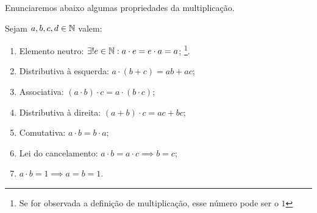 \documentclass[../main.tex]{subfiles}
\begin{document}
Enunciaremos abaixo algumas propriedades da multiplicação.
\begin{prop}{Sejam $a, b, c, d \in \mathbb{N}$ valem:}
    \begin{enumerate}[label=(\roman*)]
        \item Elemento neutro: $\exists! e \in \mathbb{N} : a \cdot e = e \cdot a = a$; \footnote{Se for observada a definição de multiplicação, esse número pode ser o $1$}.
        \item Distributiva à esquerda: $a \cdot (b + c) = ab + ac$;
        \item Associativa: $(a \cdot b) \cdot c = a \cdot (b \cdot c)$;
        \item Distributiva à direita: $(a + b) \cdot c = ac + bc$;
        \item Comutativa: $a \cdot b = b \cdot a$;
        \item Lei do cancelamento: $a \cdot b = a \cdot c \implies b = c$;
        \item $a \cdot b = 1 \implies a = b = 1$.
    \end{enumerate}
\end{prop}
\end{document}

